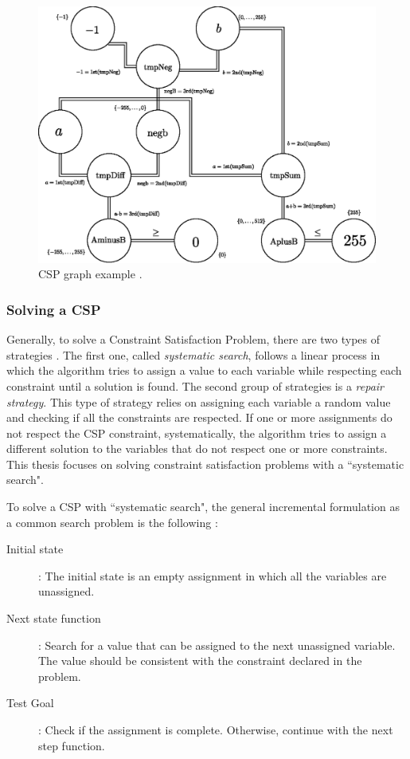 \begin{figure}[ht]
\centering
\includegraphics[width=0.7\linewidth]{pictures/Constraint_network.eps}
\caption{CSP graph example \cite{online:binarizationconstraint}.}
\label{fig:crv:graph}
\end{figure}

\subsubsection{Solving a CSP}
Generally, to solve a Constraint Satisfaction Problem, there are two types of
strategies \cite{tsang1999glimpse}. The first one, called \emph{systematic
search}, follows a linear process in which the algorithm tries to assign a value
to each variable while respecting each constraint until a solution is found. The
second group of strategies is a \emph{repair strategy}. This type of strategy
relies on assigning each variable a random value and checking if all the
constraints are respected. If one or more assignments do not respect the CSP
constraint, systematically, the algorithm tries to assign a different solution
to the variables that do not respect one or more constraints. This thesis
focuses on solving constraint satisfaction problems with a ``systematic search".

To solve a CSP with ``systematic search", the general incremental formulation as
a common search problem is the following \cite{russell2002artificial}:
\begin{description}
    \item[Initial state]: The initial state is an empty assignment in which all the variables are unassigned.
    \item[Next state function]: Search for a value that can be assigned to the next unassigned variable. The value should be consistent with the constraint declared in the problem.
    \item[Test Goal]:  Check if the assignment is complete. Otherwise, continue with the next step function.
\end{description}

